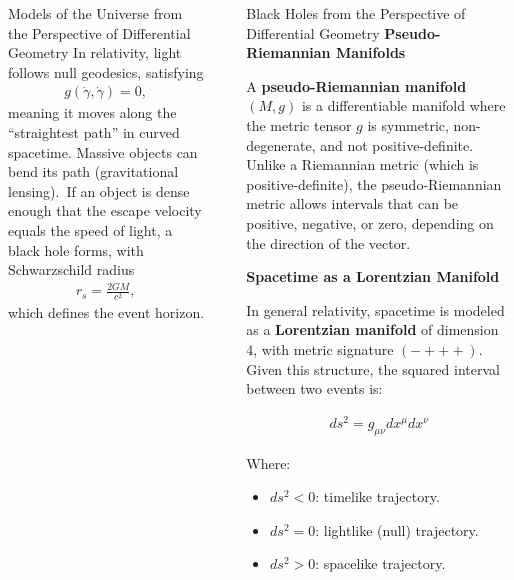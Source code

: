 \documentclass[final]{beamer}
\newlength{\sepwidth}
\newlength{\colwidth}
\newcommand{\separatorcolumn}{\begin{column}{\sepwidth}\end{column}}
\begin{document}
\begin{frame}[t]
\begin{columns}[t]
\begin{column}{\colwidth}
\begin{alertblock}{Models of the Universe from the Perspective of Differential Geometry}
        In relativity, light follows null geodesics, satisfying
        \begin{align*}
        g(\dot{\gamma}, \dot{\gamma}) = 0,
        \end{align*}
        meaning it moves along the “straightest path” in curved spacetime. Massive objects can bend its path (gravitational lensing).\
        If an object is dense enough that the escape velocity equals the speed of light, a black hole forms, with Schwarzschild radius
        \begin{align*}
        r_s = \frac{2GM}{c^2},
        \end{align*}
        which defines the event horizon.
  \end{alertblock}

\end{column}

\separatorcolumn

\begin{column}{\colwidth}

  \begin{block}{Black Holes from the Perspective of Differential Geometry}
    \textbf{\large Pseudo-Riemannian Manifolds}

      A \textbf{pseudo-Riemannian manifold} \((M, g)\) is a differentiable manifold where the metric tensor \(g\) is symmetric, non-degenerate, and not positive-definite. Unlike a Riemannian metric (which is positive-definite), the pseudo-Riemannian metric allows intervals that can be positive, negative, or zero, depending on the direction of the vector.
      
    \textbf{\large Spacetime as a Lorentzian Manifold}
      
      In general relativity, spacetime is modeled as a \textbf{Lorentzian manifold} of dimension 4, with metric signature \((-+++)\). Given this structure, the squared interval between two events is:
      
      \begin{align*}
      ds^2 = g_{\mu\nu} dx^\mu dx^\nu
      \end{align*}
      
      Where:
      \begin{itemize}
        \item \(ds^2 < 0\): timelike trajectory.
        \item \(ds^2 = 0\): lightlike (null) trajectory.
        \item \(ds^2 > 0\): spacelike trajectory.
      \end{itemize}
      

\end{block}
\end{column}
\end{columns}
\end{frame}
\end{document}
